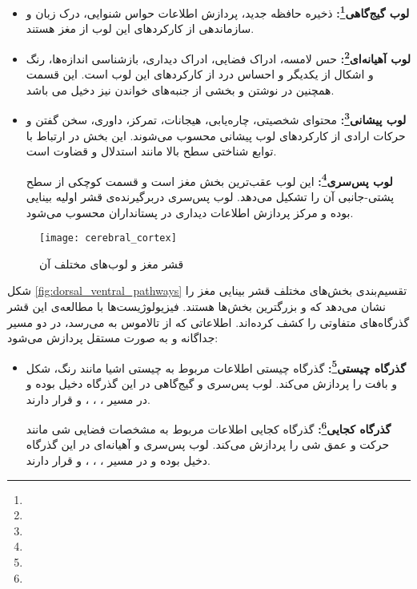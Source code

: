\begin{itemize}
\item
\textbf{لوب گیج‌گاهی\footnote{}:}
ذخیره حافظه جدید، پردازش اطلاعات حواس شنوایی، درک زبان و سازماندهی از کارکردهای این لوب از مغز هستند.

\item
\textbf{لوب آهیانه‌ای\footnote{}:}
حس لامسه، ادراک فضایی، ادراک دیداری، بازشناسی اندازه‌ها، رنگ و اشکال از یکدیگر و احساس درد از کارکردهای این لوب است. این قسمت همچنین در نوشتن و بخشی از جنبه‌های خواندن نیز دخیل می باشد. 

\item
\textbf{لوب پیشانی\footnote{}:}
محتوای شخصیتی، چاره‌یابی، هیجانات، تمرکز، داوری، سخن گفتن و حرکات ارادی از کارکردهای لوب پیشانی محسوب می‌شوند. این بخش در ارتباط با توابع شناختی سطح بالا مانند استدلال و قضاوت است.

\textbf{لوب پس‌سری\footnote{}:}
این لوب عقب‌ترین بخش مغز است و قسمت کوچکی از سطح پشتی-جانبی آن را تشکیل می‌دهد. لوب پس‌سری دربرگیرنده‌ی قشر اولیه بینایی بوده و مرکز پردازش اطلاعات دیداری در پستانداران محسوب می‌شود. 
\end{itemize}


\begin{figure}
\centering
{\footnotesize
\texttt{[image: cerebral\_cortex]}
\caption{قشر مغز و لوب‌های مختلف آن}
\label{fig:cerebral_cortex}
}
\end{figure}

شکل \ref{fig:dorsal_ventral_pathways} تقسیم‌بندی بخش‌های مختلف قشر بینایی مغز را نشان می‌دهد که  و  بزرگترین بخش‌ها هستند. فیزیولوژیست‌ها با مطالعه‌ی این قشر گذرگاه‌های متفاوتی را کشف کرده‌اند. اطلاعاتی که از تالاموس به  می‌رسد، در دو مسیر جداگانه و به صورت مستقل پردازش می‌شود:

\begin{itemize}
\item
\textbf{گذرگاه چیستی\footnote{}:}
گذرگاه چیستی اطلاعات مربوط به چیستی اشیا مانند رنگ، شکل و بافت را پردازش می‌کند. لوب پس‌سری و گیج‌گاهی در این گذرگاه دخیل بوده و در مسیر ، ، ،  و  قرار دارند. 

\textbf{گذرگاه کجایی\footnote{}:}
گذرگاه کجایی اطلاعات مربوط به مشخصات فضایی شی مانند حرکت  و عمق شی را پردازش می‌کند. لوب پس‌سری و آهیانه‌ای در این گذرگاه دخیل بوده و در مسیر ، ، ،  و  قرار دارند. 
\end{itemize}

